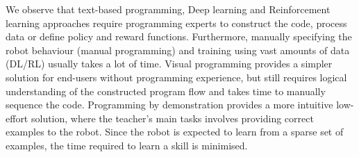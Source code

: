 
We observe that text-based programming, Deep learning and Reinforcement learning approaches require programming experts to construct the code, process data or define policy and reward functions.
Furthermore, manually specifying the robot behaviour (manual programming) and training using vast amounts of data (DL/RL) usually takes a lot of time.
Visual programming provides a simpler solution for end-users without programming experience, but still requires logical understanding of the constructed program flow and takes time to manually sequence the code. 
Programming by demonstration provides a more intuitive low-effort solution, where the teacher's main tasks involves providing correct examples to the robot.
Since the robot is expected to learn from a sparse set of examples, the time required to learn a skill is minimised.


